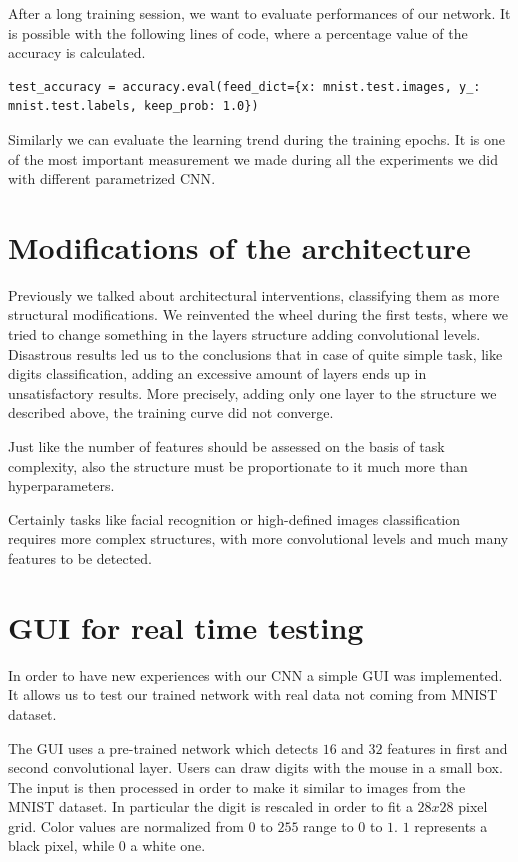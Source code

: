 After a long training session, we want to evaluate performances of our network. It is possible with the following lines of code, where a percentage value of the accuracy is calculated.

\begin{lstlisting}
test_accuracy = accuracy.eval(feed_dict={x: mnist.test.images, y_: mnist.test.labels, keep_prob: 1.0})
\end{lstlisting}

Similarly we can evaluate the learning trend during the training epochs. It is one of the most important measurement we made during all the experiments we did with different parametrized \acs{CNN}.

\section{Modifications of the architecture}

Previously we talked about architectural interventions, classifying them as more structural modifications. We reinvented the wheel during the first tests, where we tried to change something in the layers structure adding convolutional levels. Disastrous results led us to the conclusions that in case of quite simple task, like digits classification, adding an excessive amount of layers ends up in unsatisfactory results. More precisely, adding only one layer to the structure we described above, the training curve did not converge. 

Just like the number of features should be assessed on the basis of task complexity, also the structure must be proportionate to it much more than hyperparameters.

Certainly tasks like facial recognition or high-defined images classification requires more complex structures, with more convolutional levels and much many features to be detected.

\section{GUI for real time testing}

In order to have new experiences with our \acs{CNN} a simple \acs{GUI} was implemented. It allows us to test our trained network with real data not coming from MNIST dataset.

The \acs{GUI} uses a pre-trained network which detects $16$ and $32$ features in first and second convolutional layer. Users can draw digits with the mouse in a small box. The input is then processed in order to make it similar to images from the MNIST dataset. In particular the digit is rescaled in order to fit a $28x28$ pixel grid. Color values are normalized from $0$ to $255$ range to $0$ to $1$. $1$ represents a black pixel, while $0$ a white one.

